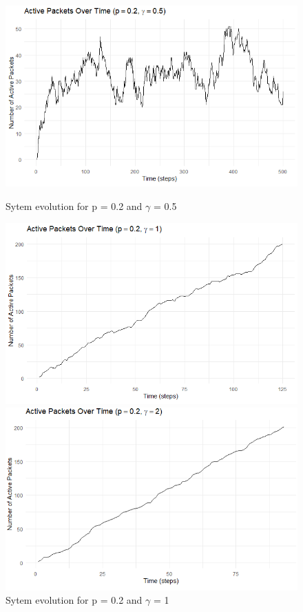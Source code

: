 \begin{figure}[H]
  \centering

  \begin{minipage}[t]{0.45\textwidth}
    \centering
    \includegraphics[width=\linewidth]{images/p02y05.png}
    \caption{Sytem evolution for p = 0.2 and $\gamma$ = 0.5}
    \label{fig:image1}
  \end{minipage}
  \hfill
  \begin{minipage}[t]{0.45\textwidth}
    \centering
    \includegraphics[width=\linewidth]{images/p02y1.png}
    \caption{Sytem evolution for p = 0.2 and $\gamma$ = 1}
    \label{fig:image2}
  \end{minipage}
  \hfill
  \begin{minipage}[t]{0.45\textwidth}
    \centering
    \includegraphics[width=\linewidth]{images/p02y2.png}

\end{minipage}
\end{figure}
